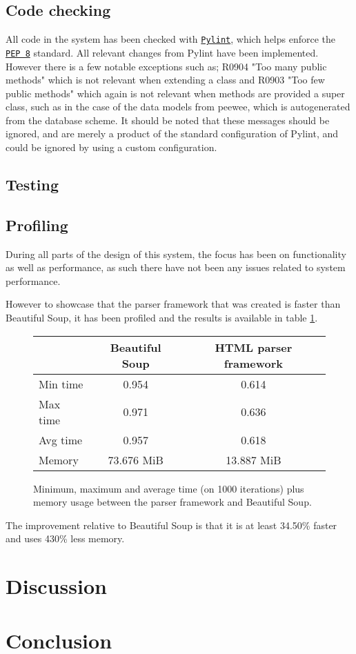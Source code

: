 \documentclass[10pt]{IEEEtran}
\begin{document}
\subsection{Code checking}
All code in the system has been checked with \href{http://www.pylint.org/}{\texttt{Pylint}}, which helps enforce the \href{http://www.python.org/dev/peps/pep-0008/}{\texttt{PEP 8}} standard. All relevant changes from Pylint have been implemented. However there is a few notable exceptions such as; R0904 "Too many public methods" which is not relevant when extending a class and R0903 "Too few public methods" which again is not relevant when methods are provided a super class, such as in the case of the data models from peewee, which is autogenerated from the database scheme. It should be noted that these messages should be ignored, and are merely a product of the standard configuration of Pylint, and could be ignored by using a custom configuration.

\subsection{Testing}


\subsection{Profiling}
During all parts of the design of this system, the focus has been on functionality as well as performance, as such there have not been any issues related to system performance.

However to showcase that the parser framework that was created is faster than Beautiful Soup, it has been profiled and the results is available in table \ref{fig:profiling}.

\begin{figure}[!h]
	\vspace*{2mm}
	\centering
	\begin{tabular}{ | l | c | c | }
  		\hline
   		 & \textbf{Beautiful Soup} & \textbf{HTML parser framework} \\ \hline
  		Min time & 0.954 & 0.614 \\ \hline
  		Max time & 0.971 & 0.636 \\ \hline
  		Avg time & 0.957 & 0.618 \\ \hline
  		Memory & 73.676 MiB & 13.887 MiB \\ \hline
	\end{tabular}
	\caption{Minimum, maximum and average time (on 1000 iterations) plus memory usage between the parser framework and Beautiful Soup. \label{fig:profiling}}
\end{figure}

The improvement relative to Beautiful Soup is that it is at least {\color{green} 34.50\%} faster and uses {\color{green} 430\%} less memory.

\section{Discussion}

\section{Conclusion}



\end{document}
